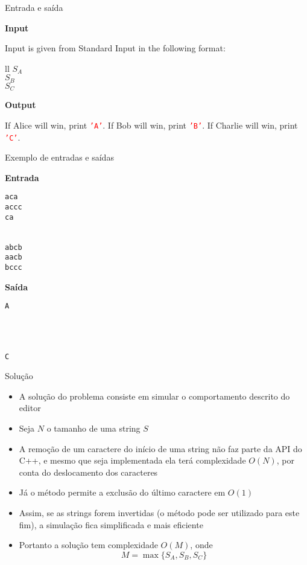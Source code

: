 \begin{frame}[fragile]{Entrada e saída}

\textbf{Input}

Input is given from Standard Input in the following format:
\begin{atcoderio}{ll}
$S_A$\\
$S_B$\\
$S_C$\\
\end{atcoderio}

\textbf{Output}

If Alice will win, print \texttt{\textcolor{red}{'A'}}. If Bob will win, print
\texttt{\textcolor{red}{'B'}}. If Charlie will win, print \texttt{\textcolor{red}{'C'}}.

\end{frame}

\begin{frame}[fragile]{Exemplo de entradas e saídas}

\begin{minipage}[t]{0.45\textwidth}
\textbf{Entrada}
\begin{verbatim}
aca
accc
ca


abcb
aacb
bccc
\end{verbatim}
\end{minipage}
\begin{minipage}[t]{0.5\textwidth}
\textbf{Saída}
\begin{verbatim}
A




C
\end{verbatim}
\end{minipage}
\end{frame}

\begin{frame}[fragile]{Solução}

    \begin{itemize}
        \item A solução do problema consiste em simular o comportamento descrito do editor

        \item Seja $N$ o tamanho de uma string $S$

        \item A remoção de um caractere do início de uma string não faz parte da API do C++, e 
            mesmo que seja implementada ela terá complexidade $O(N)$, por conta do deslocamento
            dos caracteres

        \item Já o método  permite a exclusão do último caractere em $O(1)$

        \item Assim, se as strings forem invertidas (o método  pode ser
            utilizado para este fim), a simulação fica simplificada e mais eficiente

        \item Portanto a solução tem complexidade $O(M)$, onde
        \[
            M = \max\{ S_A, S_B, S_C \}
        \]
    \end{itemize}

\end{frame}

